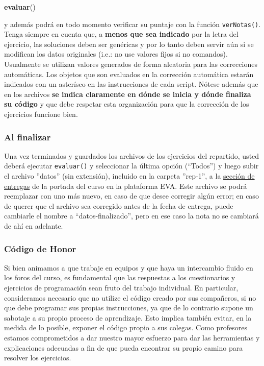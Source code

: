\documentclass[]{article}
\newenvironment{Shaded}{}{}
\newcommand{\KeywordTok}[1]{\textcolor[rgb]{0.00,0.44,0.13}{\textbf{{#1}}}}
\newcommand{\NormalTok}[1]{{#1}}
\begin{document}
\begin{Shaded}
\begin{Highlighting}[]
\KeywordTok{evaluar}\NormalTok{()}
\end{Highlighting}
\end{Shaded}
y además podrá en todo momento verificar su puntaje con la función
\texttt{verNotas()}. Tenga siempre en cuenta que, a \textbf{menos que
sea indicado} por la letra del ejercicio, las soluciones deben ser
genéricas y por lo tanto deben servir aún si se modifican los datos
originales (i.e.: no use valores fijos si no comandos). Usualmente se
utilizan valores generados de forma aleatoria para las correcciones
automáticas. Los objetos que son evaluados en la corrección automática
estarán indicados con un asterísco en las instrucciones de cada script.
Nótese además que en los archivos \textbf{se indica claramente en dónde
se inicia y dónde finaliza su código} y que debe respetar esta
organización para que la corrección de los ejercicios funcione bien.

\subsubsection{Al finalizar}

Una vez terminados y guardados los archivos de los ejercicios del
repartido, usted deberá ejecutar \texttt{evaluar()} y seleccionar la
última opción (``Todos'') y luego subir el archivo ''datos'' (sin
extensión), incluido en la carpeta ''rep-1'', a la
\href{http://eva.universidad.edu.uy/mod/assign/view.php?id=120489}{sección
de entregas} de la portada del curso en la plataforma EVA. Este archivo
se podrá reemplazar con uno más nuevo, en caso de que desee corregir
algún error; en caso de querer que el archivo sea corregido antes de la
fecha de entrega, puede cambiarle el nombre a ``datos-finalizado'', pero
en ese caso la nota no se cambiará de ahí en adelante.

\subsubsection{Código de Honor}

Si bien animamos a que trabaje en equipos y que haya un intercambio
fluido en los foros del curso, es fundamental que las respuestas a los
cuestionarios y ejercicios de programación sean fruto del trabajo
individual. En particular, consideramos necesario que no utilize el
código creado por sus compañeros, si no que debe programar sus propias
instrucciones, ya que de lo contrario supone un sabotaje a su propio
proceso de aprendizaje. Esto implica también evitar, en la medida de lo
posible, exponer el código propio a sus colegas. Como profesores estamos
comprometidos a dar nuestro mayor esfuerzo para dar las herramientas y
explicaciones adecuadas a fin de que pueda encontrar su propio camino
para resolver los ejercicios.
\end{document}
